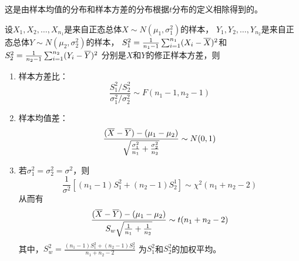 \begin{remark}
  这是由样本均值的分布和样本方差的分布根据$t$分布的定义相除得到的。
\end{remark}

\begin{theorem}
  设$X_1,X_2,\dots,X_{n_1}$是来自正态总体$X\sim N(\mu_1,\sigma_1^2)$的样本，
  $Y_1,Y_2,\dots,Y_{n_2}$是来自正态总体$Y\sim N(\mu_2,\sigma_2^2)$的样本，
  $S_1^2=\frac{1}{n_1-1}\sum_{i=1}^{n_1}(X_i-\overline{X})^2$和
  $S_2^2=\frac{1}{n_2-1}\sum_{i=1}^{n_2}(Y_i-\overline{Y})^2$
  分别是$X$和$Y$的修正样本方差，则
  \begin{enumerate}
    \item 样本方差比：
    \begin{displaymath}
      \frac{S_1^2/S_2^2}{\sigma_1^2/\sigma_2^2}\sim F(n_1-1,n_2-1)
    \end{displaymath}
    \item 样本均值差：
    \begin{displaymath}
      \frac{(\overline{X}-\overline{Y})-(\mu_1-\mu_2)}
      {\sqrt{\frac{\sigma_1^2}{n_1}+\frac{\sigma_2^2}{n_2}}}
      \sim N(0,1)
    \end{displaymath}
    \item 若$\sigma_1^2=\sigma_2^2=\sigma^2$，则
    \begin{displaymath}
      \frac{1}{\sigma^2}\left[(n_1-1)S_1^2+(n_2-1)S_2^1\right]
      \sim \chi^2(n_1+n_2-2)
    \end{displaymath}
    从而有
    \begin{displaymath}
      \frac{(\overline{X}-\overline{Y})-(\mu_1-\mu_2)}
      {S_w\sqrt{\frac{1}{n_1}+\frac{1}{n_2}}}
      \sim t(n_1+n_2-2)
    \end{displaymath}
    其中，$S_w^2=\frac{(n_1-1)S_1^2+(n_2-1)S_2^2}{n_1+n_2-2}$
    为$S_1^2$和$S_2^2$的加权平均。
  \end{enumerate}
\end{theorem}
